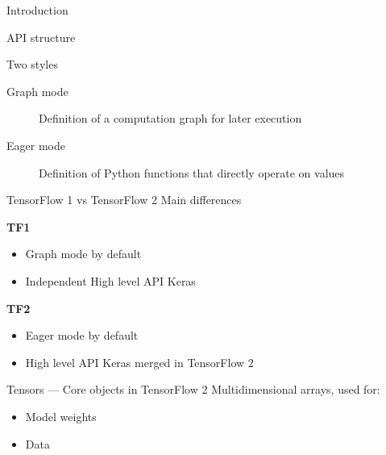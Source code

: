\begin{frame}{Introduction}
\end{frame}

\begin{frame}{API structure}
  \centering
\end{frame}

\begin{frame}{Two styles}
  \begin{description}
    \item[Graph mode] Definition of a computation graph for later execution
    \item[Eager mode] Definition of Python functions that directly operate on values
  \end{description}
\end{frame}

\begin{frame}{TensorFlow 1 vs TensorFlow 2}
  \centering
  Main differences

  \begin{minipage}[l]{0.5\linewidth}
    \centering
    \textbf{TF1}
    \begin{itemize}
      \item Graph mode by default
      \item Independent High level API Keras
    \end{itemize}
  \end{minipage}\hfill
  \begin{minipage}[l]{0.49\linewidth}
    \setcounter{beamerpauses}{1}
    \centering
    \textbf{TF2}
    \begin{itemize}
      \item Eager mode by default
      \item High level API Keras merged in TensorFlow 2
    \end{itemize}
  \end{minipage}\hfill
\end{frame}

\begin{frame}{Tensors --- Core objects in TensorFlow 2}
  Multidimensional arrays, used for:

  \begin{itemize}
    \item Model weights
    \item Data
  \end{itemize}

\end{frame}


